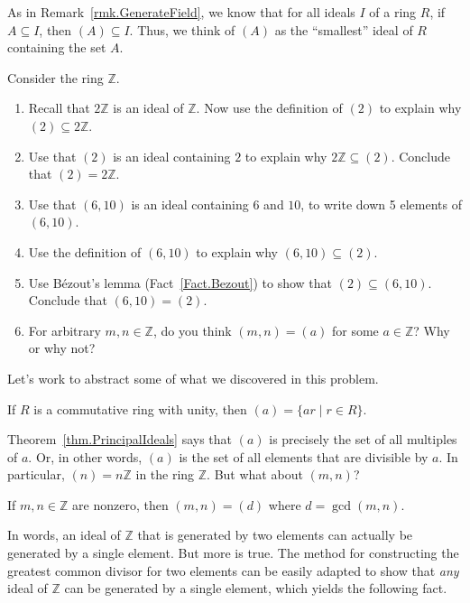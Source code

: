 As in Remark~\ref{rmk.GenerateField}, we know that for all ideals $I$ of a ring $R$, if $A\subseteq I$, then $(A) \subseteq I$. Thus, we think of $(A)$ as the ``smallest'' ideal of $R$ containing the set $A$.


\begin{problem}
Consider the ring $\mathbb{Z}$. 
\begin{enumerate}
\item Recall that $2\mathbb{Z}$ is an ideal of $\mathbb{Z}$. Now use the definition of $(2)$ to explain why $(2) \subseteq 2\mathbb{Z}$.
\item Use  that $(2)$ is an ideal containing $2$ to explain why $2\mathbb{Z}\subseteq (2)$. Conclude that $(2) = 2\mathbb{Z}$.
\item Use  that $(6,10)$ is an ideal containing $6$ and $10$, to write down 5 elements of $(6,10)$. 
\item Use the definition of $(6,10)$ to explain why $(6,10)\subseteq (2)$.
\item Use B\'ezout's lemma (Fact~\ref{Fact.Bezout}) to show that $(2) \subseteq (6,10)$. Conclude that $(6,10) = (2)$.
\item For arbitrary $m,n\in \mathbb{Z}$, do you think $(m,n) = (a)$ for some $a\in \mathbb{Z}$? Why or why not?
\end{enumerate}
\end{problem}

Let's work to abstract some of what we discovered in this problem.

\begin{theorem}\label{thm.PrincipalIdeals}
If $R$ is a commutative ring with unity, then $(a)=\{ar\mid r\in R\}$.
\end{theorem}

Theorem~\ref{thm.PrincipalIdeals} says that $(a)$ is precisely the set of all multiples of $a$. Or, in other words, $(a)$ is the set of all elements that are divisible by $a$. In particular, $(n) = n\mathbb{Z}$ in the ring $\mathbb{Z}$. But what about $(m,n)$?

\begin{theorem}
If $m,n\in \mathbb{Z}$ are nonzero, then $(m,n) = (d)$ where $d = \gcd(m,n)$.
\end{theorem}

In words, an ideal of $\mathbb{Z}$ that is generated by two elements can actually be generated by a single element. But more is true. The method for constructing the greatest common divisor for two elements can be easily adapted to show that \emph{any} ideal of $\mathbb{Z}$ can be generated by a single element, which yields the following fact.

